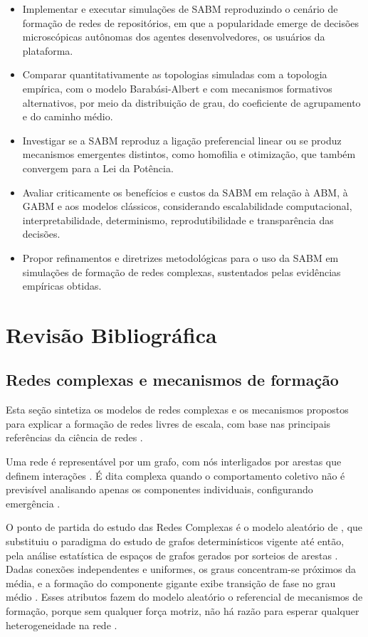 \documentclass[12pt,oneside,a4paper,brazil,sumario=tradicional]{abntex2}
\begin{document}
\begin{itemize}
  \item Implementar e executar simulações de SABM reproduzindo o cenário de formação de redes de repositórios, em que a popularidade emerge de decisões microscópicas autônomas dos agentes desenvolvedores, os usuários da plataforma.
  \item Comparar quantitativamente as topologias simuladas com a topologia empírica, com o modelo Barabási-Albert e com mecanismos formativos alternativos, por meio da distribuição de grau, do coeficiente de agrupamento e do caminho médio.
  \item Investigar se a SABM reproduz a ligação preferencial linear ou se produz mecanismos emergentes distintos, como homofilia e otimização, que também convergem para a Lei da Potência.
  \item Avaliar criticamente os benefícios e custos da SABM em relação à ABM, à GABM e aos modelos clássicos, considerando escalabilidade computacional, interpretabilidade, determinismo, reprodutibilidade e transparência das decisões.
  \item Propor refinamentos e diretrizes metodológicas para o uso da SABM em simulações de formação de redes complexas, sustentados pelas evidências empíricas obtidas.
\end{itemize}

\section{Revisão Bibliográfica}

\subsection{Redes complexas e mecanismos de formação}

Esta seção sintetiza os modelos de redes complexas e os mecanismos propostos para explicar a formação de redes livres de escala, com base nas principais referências da ciência de redes \parencite{barabasi2002, newman2010, latora2017}.

Uma rede é representável por um grafo, com nós interligados por arestas que definem interações \parencite{newman2003, wang2003}. É dita complexa quando o comportamento coletivo não é previsível analisando apenas os componentes individuais, configurando emergência \parencite{mata2020}.

O ponto de partida do estudo das Redes Complexas é o modelo aleatório de \textcite{erdos1959}, que substituiu o paradigma do estudo de grafos determinísticos vigente até então, pela análise estatística de espaços de grafos gerados por sorteios de arestas \parencite{barabasi2002, latora2017}. Dadas conexões independentes e uniformes, os graus concentram-se próximos da média, e a formação do componente gigante exibe transição de fase no grau médio \parencite{albert2002}. Esses atributos fazem do modelo aleatório o referencial de mecanismos de formação, porque sem qualquer força motriz, não há razão para esperar qualquer heterogeneidade na rede \parencite{newman2003}.
\end{document}
